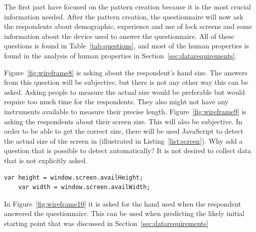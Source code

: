 \begin{figure}[H]
{        \label{fig:wireframe7}
      }
    \end{figure}

  The first part have focused on the pattern creation because it is the most crucial information needed. After the pattern creation, the questionnaire will now ask the respondents about demographic, experience and use of lock screens and some information about the device used to answer the questionnaire. All of these questions is found in Table~\ref{tab:questions}, and most of the human properties is found in the analysis of human properties in Section~\ref{sec:datarequirements}.

  Figure~\ref{fig:wireframe8} is asking about the respondent's hand size. The answers from this question will be subjective, but there is not any other way this can be asked. Asking people to measure the actual size would be preferable but would require too much time for the respondents. They also might not have any instruments available to measure their precise length. Figure~\ref{fig:wireframe9} is asking the respondents about their screen size. This will also be subjective. In order to be able to get the correct size, there will be used JavaScript to detect the actual size of the screen in (illustrated in Listing~\ref{list:screen}). Why add a question that is possible to detect automatically? It is not desired to collect data that is not explicitly asked.

  \medskip
  \begin{lstlisting}[caption=Detecting screen size in JavaScript, label=list:screen]
    var height = window.screen.availHeight;
    var width = window.screen.availWidth;
  \end{lstlisting}

  In Figure~\ref{fig:wireframe10} it is asked for the hand used when the respondent answered the questionnaire. This can be used when predicting the likely initial starting point that was discussed in Section~\ref{sec:datarequirements}

